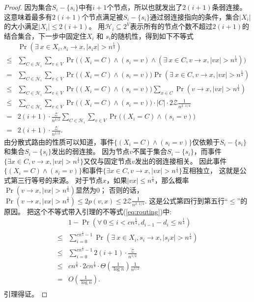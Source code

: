 \begin{proof}
因为集合$S_{i} - \{s_i\}$中有$i+1$个节点，所以也就发出了$2(i+1)$条弱连接。
这意味着最多有$2(i+1)$个节点满足被$S_{i} - \{s_i\}$通过弱连接指向的条件，集合$|X_i|$的大小满足$|X_i| \leq 2(i+1)$。
用$\mathcal{H}_{i}\subseteq 2^{V}$表示所有的节点个数不超过$2(i+1)$的结合集合，下一步中固定住$X_i$ 和 $s_i$的随机性，得到如下不等式
\begin{equation*}
\begin{array}{ll}
& \Pr(\exists~x \in X_i, s_i \to x, |s_ix| > n^{\frac{1}{4}})\\
\leq & \sum_{C \in \mathcal{H}_{i}} \sum_{v \in V} \Pr \big( (X_i=C) \land  (s_i=v)
\land (\exists~x \in C, v \to x, |vx| > n^{\frac{1}{4}}) \big)\\
= & \sum_{C \in \mathcal{H}_{i}} \sum_{v \in V} \Pr \big( (X_i=C) \land  (s_i=v) \big)
\Pr(\exists~x \in C, v \to x, |vx| > n^{\frac{1}{4}})\\
\leq & \sum_{C \in \mathcal{H}_{i}} \sum_{v \in V} \Pr \big( (X_i=C) \land  (s_i=v) \big)
\sum_{x \in C} \Pr(v \to x, |vx| > n^{\frac{1}{4}})\\
\leq & \sum_{C \in \mathcal{H}_{i}} \sum_{v \in V} \Pr \big( (X_i=C) \land  (s_i=v) \big) \cdot
|C| \cdot 2\mathcal{Z}\frac{1}{n^{2\cdot 1/4}}\\
= &  2(i+1) \cdot \frac{\mathcal{Z}}{ n^{1/2}} \sum_{C \in \mathcal{H}_{i}} \sum_{v \in V}
\Pr \big( (X_i=C) \land  (s_i=v) \big) \\
= & 2(i+1) \cdot \frac{\mathcal{Z}}{ n^{1/2}}.
\end{array}
\end{equation*}
由分散式路由的性质可以知道，事件$\{(X_i=C) \land (s_i = v)\}$仅依赖于$S_{i}-\{s_i\}$和集合$S_{i}-\{s_i\}$发出的弱连接。
因为节点$v$不属于集合$S_{i}-\{s_i\}$，而事件$\{\exists x \in C, v \to x, |vx| > n^{\frac{1}{4}} \}$又仅与固定节点$v$发出的弱连接相关。
因此事件$\{(X_i=C) \land (s_i = v) \}$和事件$\{ \exists x \in C, v \to x, |vx| > n^{\frac{1}{4}} \}$互相独立，
这就是公式第三行等号的来源。
对于节点$x$，如果$|vx| \leq n^{\frac{1}{4}}$，那么概率$\Pr(v \to x, |vx| > n^{\frac{1}{4}})$显然为$0$；
否则的话，$\Pr(v \to x, |vx| > n^{\frac{1}{4}}) \leq 2p(v,x) \leq 2\mathcal{Z}\frac{1}{ n^{2\cdot 1/4}}$.
这是公式第四行到第五行“$\leq$”的原因。
把这个不等式带入引理的不等式(\ref{eq:routing})中:
\begin{equation*}
\begin{array}{ll}
& 1- \Pr(\forall~0 \leq i < cn^{\frac{1}{4}}, d_{i-1}-d_{i}\leq n^{\frac{1}{4}})\\
\leq & \sum_{i=0}^{cn^{\frac{1}{4}}-1}\Pr(\exists~x \in X_i, s_i \to x, |s_ix| > n^{\frac{1}{4}})\\
\leq & \sum_{i=0}^{cn^{\frac{1}{4}}-1} 2(i+1) \cdot \frac{\mathcal{Z}}{ n^{1/2}} \\
\leq & cn^{\frac{1}{4}} \cdot 2cn^{\frac{1}{4}} \cdot \Theta(\frac{1}{\log{n}})\frac{1}{ n^{1/2}} \\
= & O(\frac{1}{\log n}).\\
\end{array}
\end{equation*}
引理得证。
\end{proof}

